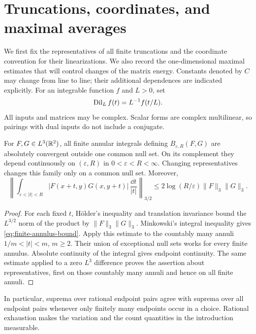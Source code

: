 \section{Truncations, coordinates, and maximal averages}
\label{sec:preliminaries}

We first fix the representatives of all finite truncations and the
coordinate convention for their linearizations. We also record the
one-dimensional maximal estimates that will control changes of the
matrix energy. Constants denoted by $C$ may change from line to line;
their additional dependences are indicated explicitly.
For an integrable function $f$ and $L>0$, set
\[
 \operatorname{Dil}_Lf(t)=L^{-1}f(t/L).
\]
All inputs and matrices may be complex. Scalar forms are complex
multilinear, so pairings with dual inputs do not include a conjugate.

\begin{lemma}\label{lem:finite-truncations}
For $F,G\in L^3(\mathbb R^2)$, all finite annular integrals defining
$B_{\varepsilon,R}(F,G)$ are absolutely convergent outside one common
null set. On its complement they depend continuously on $(\varepsilon,R)$ in
$0<\varepsilon<R<\infty$. Changing representatives changes this family
only on a common null set. Moreover,
\begin{equation}\label{eq:finite-annulus-bound}
 \left\|\int_{\varepsilon<|t|<R}
 |F(x+t,y)G(x,y+t)|\,\frac{\dd t}{|t|}\right\|_{3/2}
 \le 2\log(R/\varepsilon)\|F\|_3\|G\|_3.
\end{equation}
\end{lemma}
\begin{proof}
For each fixed $t$, H\"older's inequality and translation invariance
bound the $L^{3/2}$ norm of the product by $\|F\|_3\|G\|_3$.
Minkowski's integral inequality gives \eqref{eq:finite-annulus-bound}.
Apply this estimate to the countably many annuli $1/m<|t|<m$, $m\ge2$.
Their union of exceptional null sets works for every finite annulus.
Absolute continuity of the integral gives endpoint continuity.
The same estimate applied to a zero $L^3$ difference proves the assertion
about representatives, first on those countably many annuli and hence
on all finite annuli.
\end{proof}

In particular, suprema over rational endpoint pairs agree with suprema
over all endpoint pairs whenever only finitely many endpoints occur
in a choice. Rational exhaustion makes the variation and the count
quantities in the introduction measurable.

